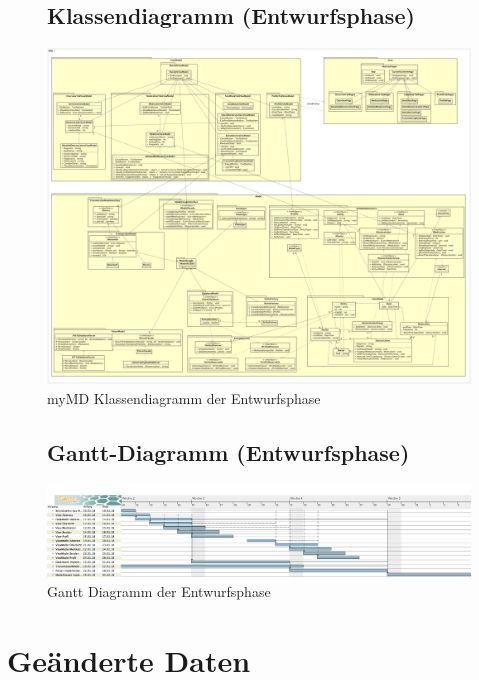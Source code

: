 \documentclass[a4paper]{scrreprt}
\begin{document}
\begin{figure}
\section{Klassendiagramm (Entwurfsphase)}
\hspace{-1.8cm}
\begin{minipage}[c]{\textwidth}
\includegraphics[width=1.6\textwidth, angle=90]{graphics/Klassendiagramme/myMD}
\caption{myMD Klassendiagramm der Entwurfsphase}
\end{minipage}
\end{figure}

\begin{figure}
\section{Gantt-Diagramm (Entwurfsphase)}
\begin{minipage}[c]{\textwidth}
\centering
\includegraphics[width=0.95\textheight, angle=90]{Gantt/GanttChart}
\caption{Gantt Diagramm der Entwurfsphase}
\end{minipage}
\end{figure}

\chapter{Geänderte Daten}
\end{document}
